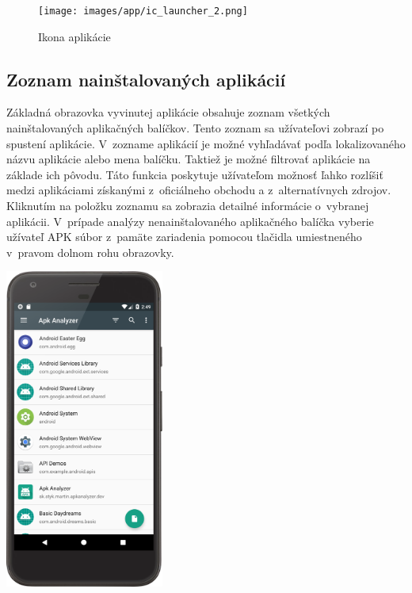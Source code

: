 \begin{figure}[htb]
	\centering
    \texttt{[image: images/app/ic\_launcher\_2.png]}
	\caption{Ikona aplikácie}
	\label{fig:icon}
\end{figure}


\subsection{Zoznam nainštalovaných aplikácií}
\begin{minipage}[H]{\textwidth}
\begin{minipage}[t]{0.48\textwidth}
Základná obrazovka vyvinutej aplikácie  obsahuje zoznam všetkých nainštalovaných aplikačných balíčkov. Tento zoznam sa užívateľovi zobrazí po spustení aplikácie. V~zozname aplikácií je možné vyhľadávať podľa lokalizovaného názvu aplikácie alebo mena balíčku. Taktiež je možné filtrovať aplikácie na základe ich pôvodu. Táto funkcia poskytuje užívateľom možnosť ľahko rozlíšiť medzi aplikáciami získanými z~oficiálneho obchodu a z~alternatívnych zdrojov. Kliknutím na položku zoznamu sa zobrazia detailné informácie o~vybranej aplikácii. V~prípade analýzy nenainštalovaného aplikačného balíčka vyberie užívateľ APK súbor z~pamäte zariadenia pomocou tlačidla umiestneného v~pravom dolnom rohu obrazovky.
\end{minipage}%
\hfill
\centering
\begin{minipage}[t][][b]{0.45\textwidth}
\centering
\includegraphics[width=5.2cm]{images/app/list_device.png}
\centering
{}
\label{fig:app-list}
\end{minipage}%
\end{minipage}

